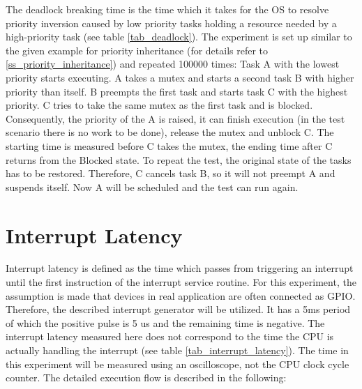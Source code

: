 The deadlock breaking time is the time which it takes for the \ac{OS} to resolve priority inversion caused by low priority tasks holding a resource needed by a high-priority task (see table \ref{tab_deadlock}). 
The experiment is set up similar to the given example for priority inheritance (for details refer to \ref{ss_priority_inheritance}) and repeated 100000 times: 
Task A with the lowest priority starts executing.
A takes a mutex and starts a second task B with higher priority than itself.
B preempts the first task and starts task C with the highest priority. 
C tries to take the same mutex as the first task and is blocked.
Consequently, the priority of the A is raised, it can finish execution (in the test scenario there is no work to be done), release the mutex and unblock C.
The starting time is measured before C takes the mutex, the ending time after C returns from the Blocked state.
To repeat the test, the original state of the tasks has to be restored.
Therefore, C cancels task B, so it will not preempt A and suspends itself.
Now A will be scheduled and the test can run again.

\section{Interrupt Latency}
Interrupt latency is defined as the time which passes from triggering an interrupt until the first instruction of the interrupt service routine. 
For this  experiment, the assumption is made that devices in real application are often connected as \ac{GPIO}.
Therefore, the described interrupt generator will be utilized.
It has a 5ms period of which the positive pulse is 5 us and the remaining time is negative.
The interrupt latency measured here does not correspond to the time the \ac{CPU} is actually handling the interrupt (see table \ref{tab_interrupt_latency}).
The time in this experiment will be measured using an oscilloscope, not the \ac{CPU} clock cycle counter.
The detailed execution flow is described in the following:

